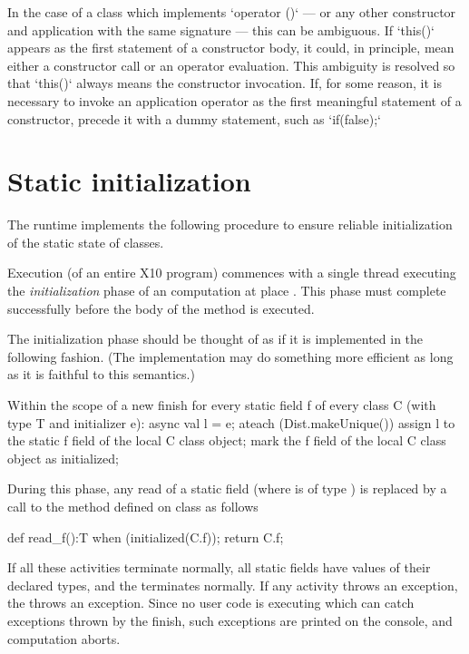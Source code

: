 In the case of a class which implements \xcd`operator ()` 
--- or any other constructor and application with the same signature --- 
this can be ambiguous.  If \xcd`this()` appears as the first statement of a
constructor body, it could, in principle, mean either a constructor call or an
operator evaluation.   This ambiguity is resolved so that \xcd`this()` always
means the constructor invocation.  If, for some reason, it is necessary to
invoke an application operator as the first meaningful statement of a
constructor, precede it with a dummy statement, such as \xcd`if(false);`  

\section{Static initialization}
\label{StaticInitialization}
The \Xten{} runtime implements the following procedure to ensure
reliable initialization of the static state of classes.


Execution (of an entire X10 program) commences with a single thread executing
the 
\emph{initialization} phase of an \Xten{} computation at place . This
phase must complete successfully before the body of the  method is
executed.

The initialization phase should be thought of as if it is implemented in
the following fashion. (The implementation may do something more
efficient as long as it is faithful to this semantics.)

\begin{xten}
Within the scope of a new finish
for every static field f of every class C 
   (with type T and initializer e):
async {
  val l = e; 
  ateach (Dist.makeUnique()) {
     assign l to the static f field of 
         the local C class object;
     mark the f field of the local C 
         class object as initialized;
  }
}
\end{xten}

During this phase, any read of a static field  (where  is of type )
is replaced by a call to the method  defined on class 
as follows

\begin{xten}
def read_f():T {
   when (initialized(C.f)){};
   return C.f;
}
\end{xten}
 

If all these activities terminate normally, all static fields have values of
their declared types, 
and the  terminates normally. If
any activity throws an exception, the  throws an
exception. Since no user code is executing which can catch exceptions
thrown by the finish, such exceptions are printed on the console, and
computation aborts.

